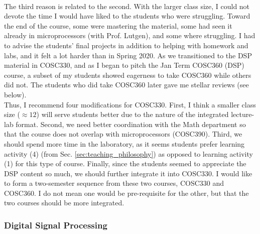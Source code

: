 \documentclass[../../main.tex]{subfiles}
\begin{document}
\\
\vspace{0.25cm}
The third reason is related to the second.  With the larger class size, I could not devote the time I would have liked to the students who were struggling.  Toward the end of the course, some were mastering the material, some had seen it already in microprocessors (with Prof. Lutgen), and some where struggling.  I had to advise the students' final projects in addition to helping with homework and labs, and it felt a lot harder than in Spring 2020.  As we transitioned to the DSP material in COSC330, and as I began to pitch the Jan Term COSC360 (DSP) course, a subset of my students showed eagerness to take COSC360 while others did not.  The students who did take COSC360 later gave me stellar reviews (see below).
\\
\vspace{0.25cm}
Thus, I recommend four modifications for COSC330.  First, I think a smaller class size ($\approx 12$) will serve students better due to the nature of the integrated lecture-lab format.  Second, we need better coordination with the Math department so that the course does not overlap with microprocessors (COSC390).  Third, we should spend more time in the laboratory, as it seems students prefer learning activity (4) (from Sec. \ref{sec:teaching_philosophy}) as opposed to learning activity (1) for this type of course.  Finally, since the students seemed to appreciate the DSP content so much, we should further integrate it into COSC330.  I would like to form a two-semester sequence from these two courses, COSC330 and COSC360.  I do not mean one would be pre-requisite for the other, but that the two courses should be more integrated.

\subsubsection{Digital Signal Processing}
\end{document}
